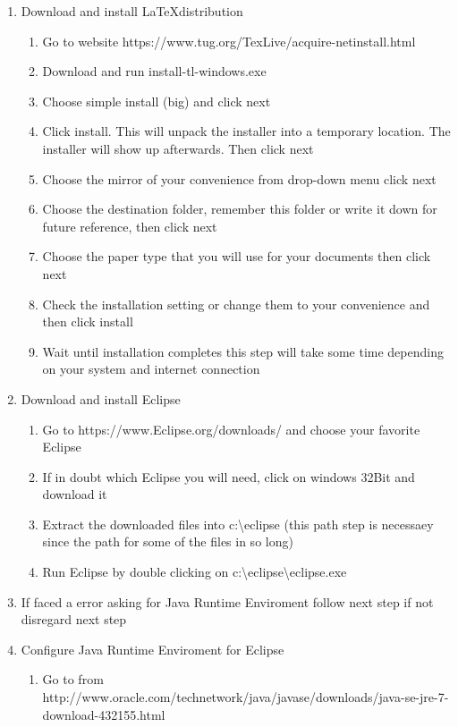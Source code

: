 \documentclass{memoir}
\begin{document}
\begin{enumerate}
  \item Download and install \LaTeX  distribution
\begin{enumerate}
  \item Go to website https://www.tug.org/TexLive/acquire-netinstall.html 
  \item Download and run install-tl-windows.exe
  \item Choose simple install (big) and click next
  \item Click install. This will unpack the installer into a temporary location. The installer will show up afterwards. Then click next
  \item Choose the mirror of your convenience from drop-down menu click next
  \item Choose the destination folder, remember this folder or write it down for future reference, then click next
  \item Choose the paper type that you will use for your documents then click next
  \item Check the installation setting or change them to your convenience and then click install
  \item Wait until installation completes this step will take some time depending on your system and internet connection
\end{enumerate}
\item Download and install Eclipse
\begin{enumerate}
  \item Go to https://www.Eclipse.org/downloads/ and choose your favorite Eclipse
  \item If in doubt which Eclipse you will need, click on windows 32Bit and download it
  \item Extract the downloaded files into c:\textbackslash  eclipse (this path step is necessaey since the path for some of the files in so long)
  \item Run Eclipse by double clicking on  c:\textbackslash  eclipse\textbackslash  eclipse.exe
\end{enumerate}
\item If faced a error asking for Java Runtime Enviroment follow next step if not disregard next step
\item Configure Java Runtime Enviroment for Eclipse
\begin{enumerate}
  \item Go to from http://www.oracle.com/technetwork/java/javase/downloads/java-se-jre-7-download-432155.html

\end{enumerate}
\end{enumerate}
\end{document}
